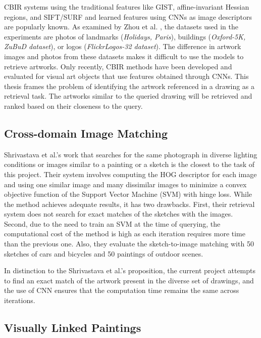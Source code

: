 CBIR systems using the traditional features like GIST, affine-invariant Hessian regions, and SIFT/SURF \cite{Philbin2007ObjectRW} and learned features using CNNs as image descriptors \cite{wan2014deep} are popularly known. As examined by Zhou et al. \cite{Zhou2017RecentAI}, the datasets used in the experiments are photos of landmarks (\textit{Holidays, Paris}), buildings (\textit{Oxford-5K, ZuBuD dataset}), or logos (\textit{FlickrLogos-32 dataset}). The difference in artwork images and photos from these datasets makes it difficult to use the models to retrieve artworks. Only recently, CBIR methods have been developed and evaluated for visual art objects \cite{seguin_2016, gultepe_2018, Castellano2021VisualLR} that use features obtained through CNNs. This thesis frames the problem of identifying the artwork referenced in a drawing as a retrieval task. The artworks similar to the queried drawing will be retrieved and ranked based on their closeness to the query.

\subsection{Cross-domain Image Matching}

Shrivastava et al.'s work \cite{Shrivastava2011DDVS} that searches for the same photograph in diverse lighting conditions or images similar to a painting or a sketch is the closest to the task of this project. Their system involves computing the HOG descriptor for each image and using one similar image and many dissimilar images to minimize a convex objective function of the Support Vector Machine (SVM) with hinge loss. While the method achieves adequate results, it has two drawbacks. First, their retrieval system does not search for exact matches of the sketches with the images. Second, due to the need to train an SVM at the time of querying, the computational cost of the method is high as each iteration requires more time than the previous one. Also, they evaluate the sketch-to-image matching with 50 sketches of cars and bicycles and 50 paintings of outdoor scenes. 

In distinction to the Shrivastava et al.'s \cite{Shrivastava2011DDVS} proposition, the current project attempts to find an exact match of the artwork present in the diverse set of drawings, and the use of CNN ensures that the computation time remains the same across iterations.

\subsection{Visually Linked Paintings}\label{chap:2:sec:REPLICA}


